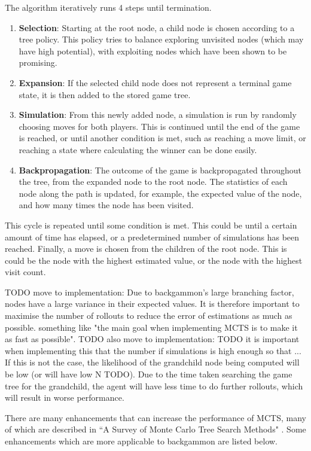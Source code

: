 The algorithm iteratively runs 4 steps until termination. 
\begin{enumerate}
    \item \textbf{Selection}: Starting at the root node, a child node is chosen according to a tree policy. This policy tries to balance exploring unvisited nodes (which may have high potential), with exploiting nodes which have been shown to be promising.
    \item \textbf{Expansion}: If the selected child node does not represent a terminal game state, it is then added to the stored game tree. 
    \item \textbf{Simulation}: From this newly added node, a simulation is run by randomly choosing moves for both players. This is continued until the end of the game is reached, or until another condition is met, such as reaching a move limit, or reaching a state where calculating the winner can be done easily.
    \item \textbf{Backpropagation}: The outcome of the game is backpropagated throughout the tree, from the expanded node to the root node. The statistics of each node along the path is updated, for example, the expected value of the node, and how many times the node has been visited. 
\end{enumerate}

This cycle is repeated until some condition is met. This could be until a certain amount of time has elapsed, or a predetermined number of simulations has been reached. Finally, a move is chosen from the children of the root node. This is could be the node with the highest estimated value, or the node with the highest visit count.

TODO move to implementation: Due to backgammon's large branching factor, nodes have a large variance in their expected values. It is therefore important to maximise the number of rollouts to reduce the error of estimations as much as possible. something like "the main goal when implementing MCTS is to make it as fast as possible".
TODO also move to implementation: TODO it is important when implementing this that the number if simulations is high enough so that ... If this is not the case, the likelihood of the grandchild node being computed will be low (or will have low N TODO). Due to the time taken searching the game tree for the grandchild, the agent will have less time to do further rollouts, which will result in worse performance. 

There are many enhancements that can increase the performance of MCTS, many of which are described in ``A Survey of Monte Carlo Tree Search Methods" \cite{Browne2012}. Some enhancements which are more applicable to backgammon are listed below.

